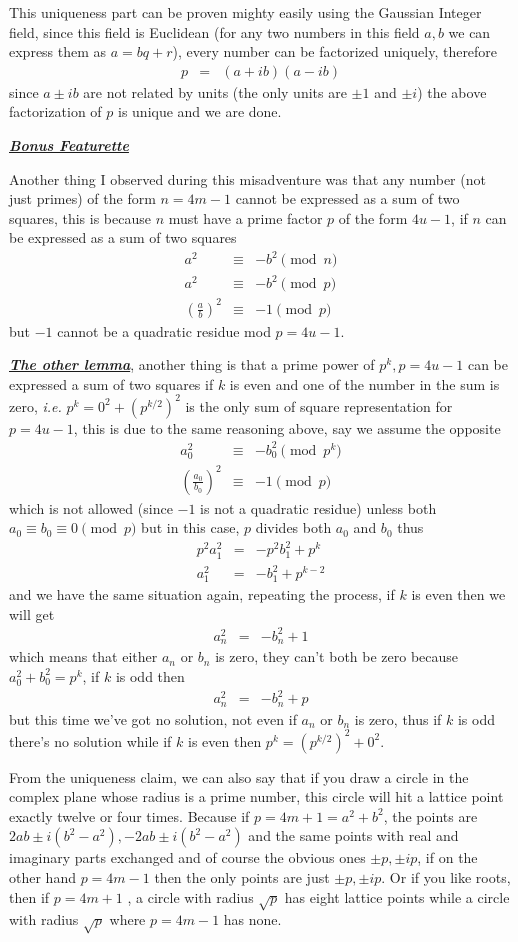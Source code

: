 \documentclass[aps,preprint,preprintnumbers,nofootinbib,showpacs,prd]{revtex4-1}
\newcommand{\ie}{{\it i.e.} }
\newcommand{\nbea}{\begin{eqnarray*}}
\newcommand{\neea}{\end{eqnarray*}}
\begin{document}
This uniqueness part can be proven mighty easily using the Gaussian Integer field, since this field is Euclidean (for any two numbers in this field $a, b$ we can express them as $a = bq + r$), every number can be factorized uniquely, therefore
%
\nbea
p & = & (a + ib)(a - ib)
\neea
%
since $a \pm ib$ are not related by units (the only units are $\pm1$ and $\pm i$) the above factorization of $p$ is unique and we are done.

\smallskip
\underline{\textit{\textbf{Bonus Featurette}}}
\smallskip

Another thing I observed during this misadventure was that any number (not just primes) of the form $n = 4m-1$ cannot be expressed as a sum of two squares, this is because $n$ must have a prime factor $p$ of the form $4u-1$, if $n$ can be expressed as a sum of two squares
%
\nbea
a^2 & \equiv & - b^2 \pmod{n} \\
a^2 & \equiv & - b^2 \pmod{p} \\
\left(\frac{a}{b}\right)^2 & \equiv & - 1 \pmod{p}
\neea
%
but $-1$ cannot be a quadratic residue mod $p = 4u-1$.

\underline{\textit{\textbf{The other lemma}}}, another thing is that a prime power of $p^k, p = 4u-1$ can be expressed a sum of two squares if $k$ is even and one of the number in the sum is zero, \ie $p^k = 0^2 + (p^{k/2})^2$ is the only sum of square representation for $p =4u-1$, this is due to the same reasoning above, say we assume the opposite
%
\nbea
a_0^2 & \equiv & - b_0^2 \pmod{p^k} \\
\left(\frac{a_0}{b_0}\right)^2 & \equiv & - 1 \pmod{p}
\neea
%
which is not allowed (since $-1$ is not a quadratic residue) unless both $a_0 \equiv b_0 \equiv 0 \pmod{p}$ but in this case, $p$ divides both $a_0$ and $b_0$ thus
%
\nbea
p^2 a_1^2 & = & -p^2 b_1^2 + p^{k} \\
a_1^2 & = & -b_1^2 + p^{k-2}
\neea
%
and we have the same situation again, repeating the process, if $k$ is even then we will get 
%
\nbea
a_n^2 & = & -b_n^2 + 1
\neea
%
which means that either $a_n$ or $b_n$ is zero, they can't both be zero because $a_0^2 + b_0^2 = p^k$, if $k$ is odd then
%
\nbea
a_n^2 & = & -b_n^2 + p
\neea
%
but this time we've got no solution, not even if $a_n$ or $b_n$ is zero, thus if $k$ is odd there's no solution while if $k$ is even then $p^k = (p^{k/2})^2 + 0^2$.

From the uniqueness claim, we can also say that if you draw a circle in the complex plane whose radius is a prime number, this circle will hit a lattice point exactly twelve or four times. Because if $p = 4m+1 = a^2 + b^2$, the points are $2ab\pm i(b^2-a^2),-2ab\pm i(b^2-a^2)$ and the same points with real and imaginary parts exchanged and of course the obvious ones $\pm p, \pm ip$, if on the other hand $p = 4m-1$ then the only points are just $\pm p, \pm ip$. Or if you like roots, then if $p = 4m+1$ , a circle with radius $\sqrt{p}$ has eight lattice points while a circle with radius $\sqrt{p}$ where $p=4m-1$ has none.
\end{document}

